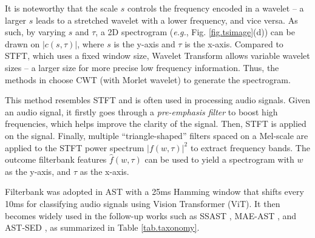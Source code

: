 It is noteworthy that the scale $s$ controls the frequency encoded in a wavelet -- a larger $s$ leads to a stretched wavelet with a lower frequency, and vice versa. As such, by varying $s$ and $\tau$, a 2D spectrogram ({\em e.g.}, Fig. \ref{fig.tsimage}(d)) can be drawn %
on $|c(s,\tau)|$, where $s$ is the y-axis and $\tau$ is the x-axis. Compared to STFT, which uses a fixed window size, Wavelet Transform allows variable wavelet sizes -- a larger size %
for more precise low frequency information. 
Thus, the methods in \cite{du2020image,namura2024training,zeng2023pixels} choose CWT (with Morlet wavelet) to generate the spectrogram.


\vspace{0.2cm}

 This method %
resembles STFT and is often used in processing audio signals. Given an audio signal, it firstly goes through a {\em pre-emphasis filter} to boost high frequencies, which helps improve the clarity of the signal. Then, STFT is applied on the signal. %
Finally, multiple ``triangle-shaped'' filters spaced on a Mel-scale are applied to the STFT power spectrum $|f(w, \tau)|^{2}$ to extract frequency bands. The outcome filterbank features $\hat{f}(w, \tau)$ can be used to yield a spectrogram with $w$ as the y-axis, and $\tau$ as the x-axis.

Filterbank was adopted in AST \cite{gong2021ast} with 
a 25ms Hamming window that shifts every 10ms for classifying audio signals using Vision Transformer (ViT). It then becomes widely used in the follow-up works such as SSAST \cite{gong2022ssast}, MAE-AST \cite{baade2022mae}, and AST-SED \cite{li2023ast}, as summarized in Table \ref{tab.taxonomy}.



